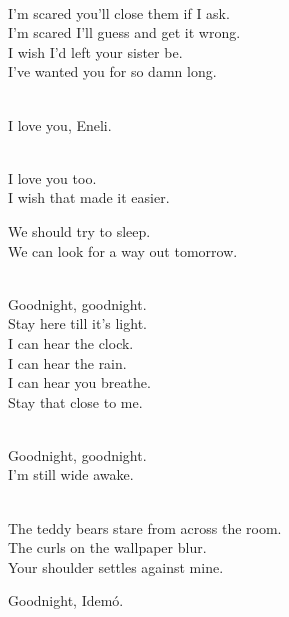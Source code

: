 \begin{lyrics}
\\
I’m scared you’ll close them if I ask.\\
I’m scared I’ll guess and get it wrong.\\
I wish I’d left your sister be.\\
I’ve wanted you for so damn long.


\\
I love you, Eneli.

\\
I love you too.\\
I wish that made it easier.

We should try to sleep.\\
We can look for a way out tomorrow.

\\
Goodnight, goodnight.\\
Stay here till it’s light.\\
I can hear the clock.\\
I can hear the rain.
\\
I can hear you breathe.\\
Stay that close to me.

\\
Goodnight, goodnight.
\\
I’m still wide awake.


\\
The teddy bears stare from across the room.\\
The curls on the wallpaper blur.\\
Your shoulder settles against mine.

Goodnight, Idemó.
\end{lyrics}

